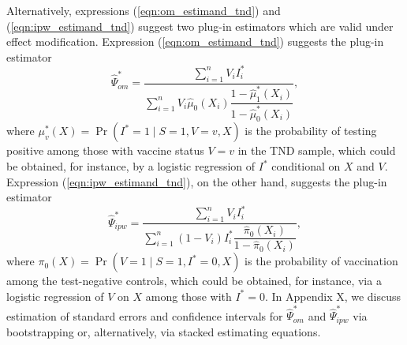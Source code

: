 \documentclass[11pt]{article}
\begin{document}
Alternatively, expressions (\ref{eqn:om_estimand_tnd}) and (\ref{eqn:ipw_estimand_tnd}) suggest two plug-in estimators which are valid under effect modification. Expression (\ref{eqn:om_estimand_tnd}) suggests the plug-in estimator
\begin{equation}\label{eqn:om_estimator}
    \widehat{\Psi}_{om}^* = \dfrac{\sum_{i=1}^n V_i I^*_i}{\sum_{i=1}^n V_i \widehat{\mu}_0(X_i)\dfrac{1 - \widehat{\mu}^*_1(X_i)}{1 - \widehat{\mu}^*_0(X_i)}},
\end{equation}
where $\mu^*_v(X) = \Pr(I^*=1\mid S=1, V=v, X)$ is the probability of testing positive among those with vaccine status $V =v$ in the TND sample, which could be obtained, for instance, by a logistic regression of $I^*$ conditional on $X$ and $V$. Expression (\ref{eqn:ipw_estimand_tnd}), on the other hand, suggests the plug-in estimator
\begin{equation}\label{eqn:ipw_estimator}
    \widehat{\Psi}_{ipw}^* = \dfrac{\sum_{i=1}^n V_i I^*_i}{\sum_{i=1}^n (1 - V_i) I^*_i \dfrac{\widehat\pi_0(X_i)}{1 - \widehat\pi_0(X_i)}},
\end{equation}
where $\pi_0(X) = \Pr(V=1\mid S=1, I^*=0, X)$ is the probability of vaccination among the test-negative controls, which could be obtained, for instance, via a logistic regression of $V$ on $X$ among those with $I^*=0$. In Appendix X, we discuss estimation of standard errors and confidence intervals for $\widehat{\Psi}_{om}^*$ and $\widehat{\Psi}_{ipw}^*$ via bootstrapping or, alternatively, via stacked estimating equations. 
\end{document}
